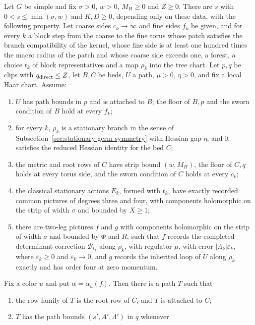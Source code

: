 \begin{proposition}
\label{prop:stationary-output-path}
Let $G$ be simple and fix $\sigma>0$, $w>0$, $M_H\geq0$ and
$Z\geq0$. There are $s$ with $0<s\leq\min(\sigma,w)$ and
$K,D\geq0$, depending only on these data, with the following
property. Let coarse sides $c_k\to\infty$ and fine sides $f_k$ be
given, and for every $k$ a block step from the coarse to the fine
torus whose patch satisfies the branch compatibility of the kernel,
whose fine side is at least one hundred times the macro radius of the
patch and whose coarse side exceeds one, a forest, a choice $t_k$ of block representatives and a
map $\rho_k$ into the tree chart. Let $p,q$ be clips with
$q_{\rm direct}\leq Z$, let $B,C$ be beds, $U$ a path, $\mu>0$,
$\eta>0$, and fix a local Haar chart. Assume:
\begin{enumerate}
\item $U$ has path bounds in $p$ and is attached to $B$; the floor of
 $B,p$ and the sworn condition of $B$ hold at every $f_k$;
\item for every $k$, $\rho_k$ is a stationary branch in the sense of
 Subsection~\ref{sec:stationary-germ-symmetry} with Hessian gap $\eta$,
 and it satisfies the reduced Hessian identity for the bed $C$;
\item the metric and root rows of $C$ have strip bound $(w,M_H)$, the
 floor of $C,q$ holds at every torus side, and the sworn condition of
 $C$ holds at every $c_k$;
\item the classical stationary actions $E_k$, formed with $t_k$, have
 exactly recorded common pictures of degrees three and four, with
 components holomorphic on the strip of width $\sigma$ and bounded by
 $X\geq1$;
\item there are two-leg pictures $f$ and $g$ with components
 holomorphic on the strip of width $\sigma$ and bounded by $\Phi$ and
 $R$, such that $f$ records the completed determinant correction
 $\mathcal B_{t_k}$ along $\rho_k$, with regulator $\mu$, with error
 $|\Lambda_k|\varepsilon_k$, where $\varepsilon_k\geq0$ and
 $\varepsilon_k\to0$, and $g$ records the inherited loop of $U$ along
 $\rho_k$ exactly and has order four at zero momentum.
\end{enumerate}
Fix a color $u$ and put $\alpha=\alpha_u(f)$. Then there is a path $T$
such that
\begin{enumerate}
\item[(a)] the row family of $T$ is the root row of $C$, and $T$ is
 attached to $C$;
\item[(b)] $T$ has the path bounds $(s',A',\Lambda')$ in $q$ whenever

\end{enumerate}
\end{proposition}
